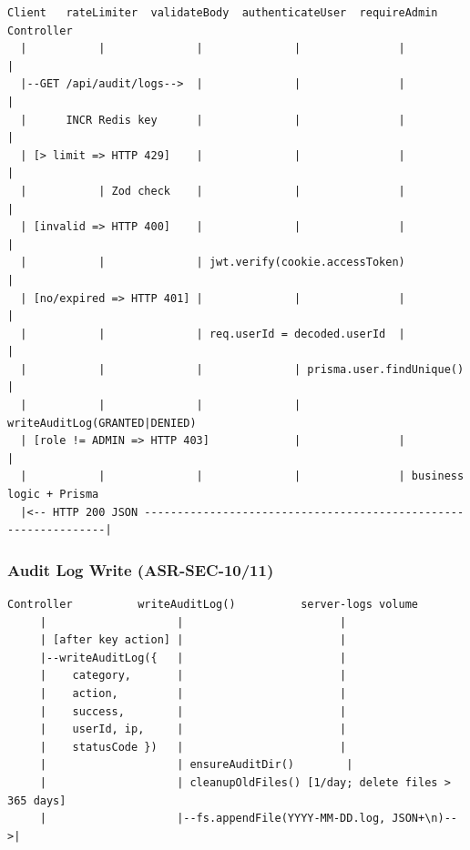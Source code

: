 \documentclass[12pt,a4paper]{article}
\begin{document}
\begin{lstlisting}[caption={Middleware chain -- rateLimit.ts + auth.middleware.ts}]
Client   rateLimiter  validateBody  authenticateUser  requireAdmin  Controller
  |           |              |              |               |             |
  |--GET /api/audit/logs-->  |              |               |             |
  |      INCR Redis key      |              |               |             |
  | [> limit => HTTP 429]    |              |               |             |
  |           | Zod check    |              |               |             |
  | [invalid => HTTP 400]    |              |               |             |
  |           |              | jwt.verify(cookie.accessToken)             |
  | [no/expired => HTTP 401] |              |               |             |
  |           |              | req.userId = decoded.userId  |             |
  |           |              |              | prisma.user.findUnique()    |
  |           |              |              | writeAuditLog(GRANTED|DENIED)
  | [role != ADMIN => HTTP 403]             |               |             |
  |           |              |              |               | business logic + Prisma
  |<-- HTTP 200 JSON ----------------------------------------------------------------|
\end{lstlisting}

\subsubsection{Audit Log Write (ASR-SEC-10/11)}

\begin{lstlisting}[caption={Audit log lifecycle -- util/auditLogger.ts}]
Controller          writeAuditLog()          server-logs volume
     |                    |                        |
     | [after key action] |                        |
     |--writeAuditLog({   |                        |
     |    category,       |                        |
     |    action,         |                        |
     |    success,        |                        |
     |    userId, ip,     |                        |
     |    statusCode })   |                        |
     |                    | ensureAuditDir()        |
     |                    | cleanupOldFiles() [1/day; delete files > 365 days]
     |                    |--fs.appendFile(YYYY-MM-DD.log, JSON+\n)-->|
\end{lstlisting}

\end{document}
